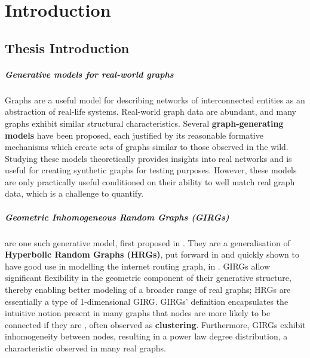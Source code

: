 \chapter{Introduction}
\label{chap:introduction}
\section{Thesis Introduction}
\paragraph{Generative models for real-world graphs} Graphs are a useful model for describing networks of interconnected entities as an abstraction of real-life systems. Real-world graph data are abundant, and many graphs exhibit similar structural characteristics. Several \textbf{graph-generating models} have been proposed, each justified by its reasonable formative mechanisms which create sets of graphs similar to those observed in the wild. Studying these models theoretically provides insights into real networks and is useful for creating synthetic graphs for testing purposes. However, these models are only practically useful conditioned on their ability to well match real graph data, which is a challenge to quantify.

\paragraph{Geometric Inhomogeneous Random Graphs (GIRGs)} are one such generative model, first proposed in \cite{bringmann2016average}. They are a generalisation of \textbf{Hyperbolic Random Graphs (HRGs)}, put forward in \cite{krioukov2010hyperbolic} and quickly shown to have good use in modelling the internet routing graph, in \cite{boguna2010sustaining}. GIRGs allow significant flexibility in the geometric component of their generative structure, thereby enabling better modeling of a broader range of real graphs; HRGs are essentially a type of 1-dimensional GIRG. GIRGs' definition encapsulates the intuitive notion present in many graphs that nodes are more likely to be connected if they are , often observed as \textbf{clustering}. Furthermore, GIRGs exhibit inhomogeneity between nodes, resulting in a power law degree distribution, a characteristic observed in many real graphs.

